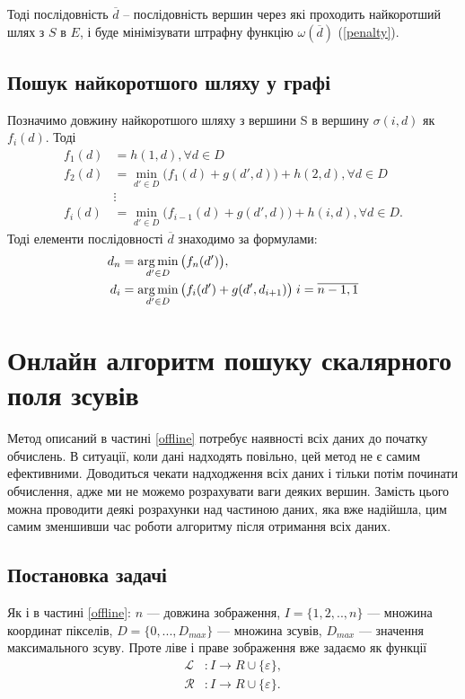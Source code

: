 Тоді послідовність $\overline{d}$ -- послідовність вершин через які проходить найкоротший шлях з $S$ в $E$, і буде мінімізувати штрафну функцію $ \omega(\overline{d}) $ (\ref{penalty}).


\subsection{Пошук найкоротшого шляху у графі}
Позначимо довжину найкоротшого шляху з вершини S в вершину $ \sigma(i, d) $ як $ f_i (d) $. 
Тоді 
\begin{align*}
	f_1 (d) &= h(1, d),  \forall d \in D \\
	f_2 (d) &=  \min\limits_{d' \in D}\Big( f_1(d) + g(d', d) \Big) + h(2, d),  \forall d \in D \\
	&\vdots \\
	f_i (d) &= \min\limits_{d' \in D}\Big( f_{i-1}(d) + g(d', d) \Big) + h(i, d),  \forall d \in D .
\end{align*}
Тоді елементи послідовності $\overline{d}$ знаходимо за формулами:
\begin{align*}
d_n &= \operatorname*{arg\,min}\limits_{d' \in D}{\big( f_n(d') \big)}, \\
d_i &= \operatorname*{arg\,min}\limits_{d' \in D}{\big( f_{i}(d') + g(d',d_{i+1})\big) \; i = \overline{n-1, 1}}
\end{align*}
\newpage



\section{Онлайн алгоритм пошуку скалярного поля зсувів}
Метод описаний в частині \ref{offline} потребує наявності всіх даних до початку обчислень. В ситуації, коли дані надходять повільно, цей метод не є самим ефективними. Доводиться чекати надходження всіх даних і тільки потім починати обчислення, адже ми не можемо розрахувати ваги деяких вершин.
Замість цього можна проводити деякі розрахунки над частиною даних, яка вже надійшла, цим самим зменшивши час роботи алгоритму після отримання всіх даних.

\subsection{Постановка задачі}
Як і в частині \ref{offline}: $n$ --- довжина зображення, $I = \{1, 2, .., n\}$ --- множина координат пікселів, $D = \{0, ... , D_{max}\}$ --- множина зсувів, $D_{max}$ --- значення максимального зсуву. 
Проте ліве і праве зображення вже задаємо як функції 
\begin{align*}
	\mathcal{L} &: I \rightarrow R \cup \{ \varepsilon \}, \\
	\mathcal{R} &: I \rightarrow R \cup \{ \varepsilon \}.
\end{align*}

